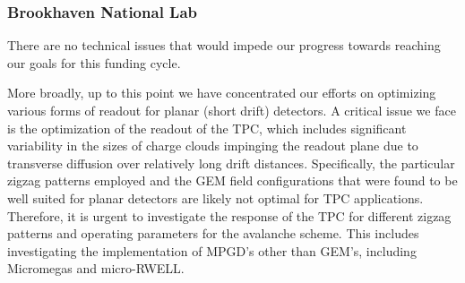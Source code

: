 \subsubsection{Brookhaven National Lab} 
There are no technical issues that would impede our progress towards reaching our goals for this funding cycle.    

More broadly, up to this point we have concentrated our efforts on optimizing various forms of readout for planar (short drift) detectors. A critical issue we face is the optimization of the readout of the TPC, which includes significant variability in the sizes of charge clouds impinging the readout plane due to transverse diffusion over relatively long drift distances. Specifically, the particular zigzag patterns employed and the GEM field configurations that were found to be well suited for planar detectors are likely not optimal for TPC applications. Therefore, it is urgent to investigate the response of the TPC for different zigzag patterns and operating parameters for the avalanche scheme. This includes investigating the implementation of MPGD's other than GEM's, including Micromegas and micro-RWELL.       